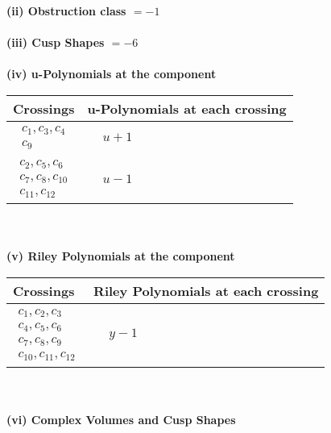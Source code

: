 \documentclass[1p]{elsarticle_modified}
\theoremstyle{definition}
\begin{document}
\flushleft \textbf{(ii) Obstruction class $= -1$}\\~\\
\flushleft \textbf{(iii) Cusp Shapes $= -6$}\\~\\
\newpage\renewcommand{\arraystretch}{1}
\flushleft \textbf{(iv) u-Polynomials at the component}\newline \\
\begin{tabular}{m{50pt}|m{274pt}}
Crossings & \hspace{64pt}u-Polynomials at each crossing \\
\hline $$\begin{aligned}c_{1},c_{3},c_{4}\\c_{9}\end{aligned}$$&$\begin{aligned}
&u+1
\end{aligned}$\\
\hline $$\begin{aligned}c_{2},c_{5},c_{6}\\c_{7},c_{8},c_{10}\\c_{11},c_{12}\end{aligned}$$&$\begin{aligned}
&u-1
\end{aligned}$\\
\hline
\end{tabular}\\~\\
\newpage\renewcommand{\arraystretch}{1}
\flushleft \textbf{(v) Riley Polynomials at the component}\newline \\
\begin{tabular}{m{50pt}|m{274pt}}
Crossings & \hspace{64pt}Riley Polynomials at each crossing \\
\hline $$\begin{aligned}c_{1},c_{2},c_{3}\\c_{4},c_{5},c_{6}\\c_{7},c_{8},c_{9}\\c_{10},c_{11},c_{12}\end{aligned}$$&$\begin{aligned}
&y-1
\end{aligned}$\\
\hline
\end{tabular}\\~\\
\newpage\flushleft \textbf{(vi) Complex Volumes and Cusp Shapes}
\end{document}
